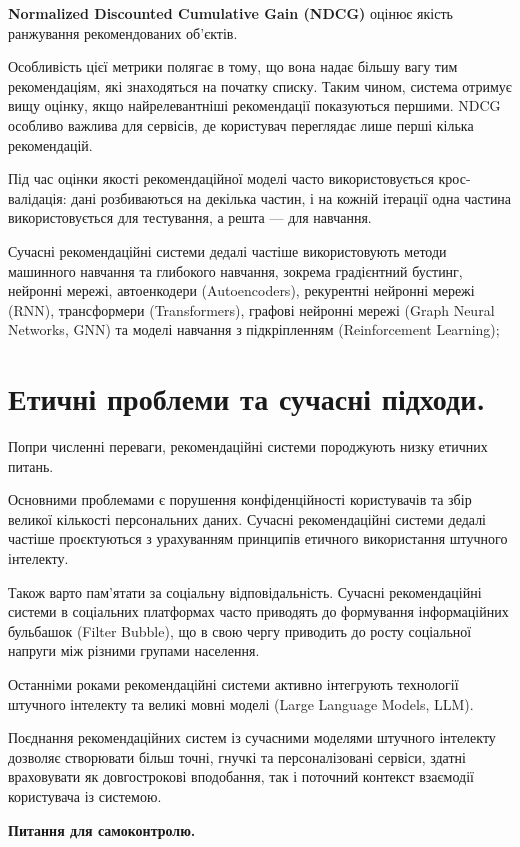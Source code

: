 \textbf{Normalized Discounted Cumulative Gain (NDCG)} оцінює якість ранжування рекомендованих об'єктів.

Особливість цієї метрики полягає в тому, що вона надає більшу вагу тим рекомендаціям, які знаходяться на початку списку. Таким чином, система отримує вищу оцінку, якщо найрелевантніші рекомендації показуються першими. NDCG особливо важлива для сервісів, де користувач переглядає лише перші кілька рекомендацій.

Під час оцінки якості рекомендаційної моделі часто використовується крос-валідація: дані розбиваються на декілька частин, і на кожній ітерації одна частина використовується для тестування, а решта — для навчання.


 Сучасні рекомендаційні системи дедалі частіше використовують методи машинного навчання та глибокого навчання, зокрема градієнтний бустинг, нейронні мережі, автоенкодери (Autoencoders), рекурентні нейронні мережі (RNN), трансформери (Transformers), графові нейронні мережі (Graph Neural Networks, GNN) та моделі навчання з підкріпленням (Reinforcement Learning);


\section{Етичні проблеми та сучасні підходи.}

Попри численні переваги, рекомендаційні системи породжують низку етичних питань. 

Основними проблемами є порушення конфіденційності користувачів та збір великої кількості персональних даних. Сучасні рекомендаційні системи дедалі частіше проєктуються з урахуванням принципів етичного використання штучного інтелекту. 

Також варто пам'ятати за соціальну відповідальність. Сучасні рекомендаційні системи в соціальних платформах часто приводять до формування інформаційних бульбашок (Filter Bubble), що в свою чергу приводить до росту соціальної напруги між різними групами населення.

Останніми роками рекомендаційні системи активно інтегрують технології штучного інтелекту та великі мовні моделі (Large Language Models, LLM).

Поєднання рекомендаційних систем із сучасними моделями штучного інтелекту дозволяє створювати більш точні, гнучкі та персоналізовані сервіси, здатні враховувати як довгострокові вподобання, так і поточний контекст взаємодії користувача із системою.


 \textbf{Питання для самоконтролю.}


